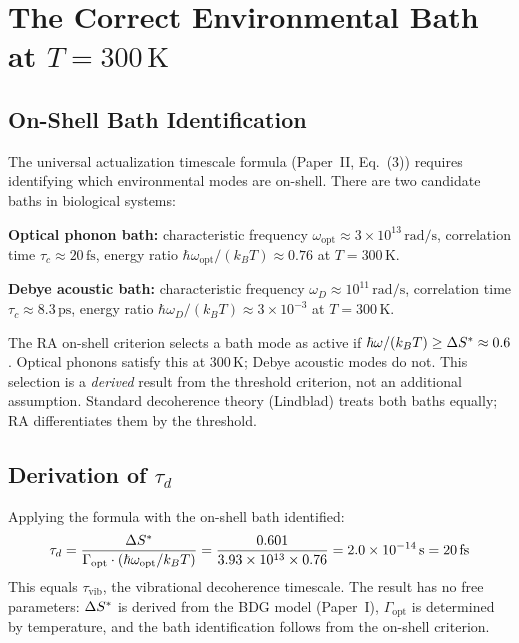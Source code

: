 \documentclass[12pt,a4paper]{article}
\begin{document}
\section{The Correct Environmental Bath at $T=300\,\mathrm{K}$}\label{sec:bath}

\subsection{On-Shell Bath Identification}

The universal actualization timescale formula (Paper~II, Eq.~(3)) requires identifying which environmental modes are on-shell.  There are two candidate baths in biological systems:

\textbf{Optical phonon bath:} characteristic frequency $\omega_{\mathrm{opt}} \approx 3\times10^{13}\,\mathrm{rad/s}$, correlation time $\tau_c \approx 20\,\mathrm{fs}$, energy ratio $\hbar\omega_{\mathrm{opt}}/(k_BT) \approx 0.76$ at $T=300\,\mathrm{K}$.

\textbf{Debye acoustic bath:} characteristic frequency $\omega_D \approx 10^{11}\,\mathrm{rad/s}$, correlation time $\tau_c \approx 8.3\,\mathrm{ps}$, energy ratio $\hbar\omega_D/(k_BT) \approx 3\times10^{-3}$ at $T=300\,\mathrm{K}$.

The RA on-shell criterion selects a bath mode as active if $\hbar\omega/(k_BT) \geq \Delta S^* \approx 0.6$.  Optical phonons satisfy this at $300\,\mathrm{K}$; Debye acoustic modes do not.  This selection is a \emph{derived} result from the threshold criterion, not an additional assumption.  Standard decoherence theory (Lindblad) treats both baths equally; RA differentiates them by the threshold.

\subsection{Derivation of $\tau_d$}

Applying the formula with the on-shell bath identified:
\begin{equation}
  \tau_d = \frac{\Delta S^*}{\Gamma_{\mathrm{opt}}\cdot(\hbar\omega_{\mathrm{opt}}/k_BT)} = \frac{0.601}{3.93\times10^{13}\times 0.76} = 2.0\times10^{-14}\,\mathrm{s} = 20\,\mathrm{fs}
  \label{eq:taud}
\end{equation}
This equals $\tau_{\mathrm{vib}}$, the vibrational decoherence timescale.  The result has no free parameters: $\Delta S^*$ is derived from the BDG model (Paper~I), $\Gamma_{\mathrm{opt}}$ is determined by temperature, and the bath identification follows from the on-shell criterion.
\end{document}
